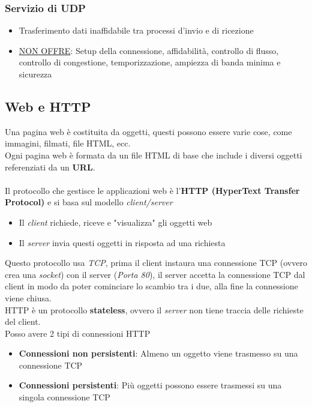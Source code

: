 \documentclass{article}
\begin{document}
            \subsubsection{Servizio di UDP}
                \begin{itemize}
                    \item Trasferimento dati inaffidabile tra processi d'invio e di ricezione
                    \item \underline{NON OFFRE}: Setup della connessione, affidabilità, controllo di flusso, controllo di congestione, temporizzazione, ampiezza di banda minima e sicurezza
                \end{itemize}

        \subsection{Web e HTTP}
            Una pagina web è costituita da oggetti, questi possono essere varie cose, come immagini, filmati, file HTML, ecc.\\
            Ogni pagina web è formata da un file HTML di base che include i diversi oggetti referenziati da un \textbf{URL}.\\
            \\
            Il protocollo che gestisce le applicazioni web è l'\textbf{HTTP (HyperText Transfer Protocol)} e si basa sul modello \textit{client/server}
            \begin{itemize}
                \item Il \textit{client} richiede, riceve e "visualizza" gli oggetti web
                \item Il \textit{server} invia questi oggetti in risposta ad una richiesta
            \end{itemize}
            Questo protocollo usa \textit{TCP}, prima il client instaura una connessione TCP (ovvero crea una \textit{socket}) con il server (\textit{Porta 80}), il server accetta la connessione TCP dal client in modo da poter cominciare lo scambio tra i due, alla fine la connessione viene chiusa.\\
            HTTP è un protocollo \textbf{stateless}, ovvero il \textit{server} non tiene traccia delle richieste del client.\\
            Posso avere 2 tipi di connessioni HTTP
            \begin{itemize}
                \item \textbf{Connessioni non persistenti}: Almeno un oggetto viene trasmesso su una connessione TCP
                \item \textbf{Connessioni persistenti}: Più oggetti possono essere trasmessi su una singola connessione TCP
            \end{itemize} 
\end{document}
